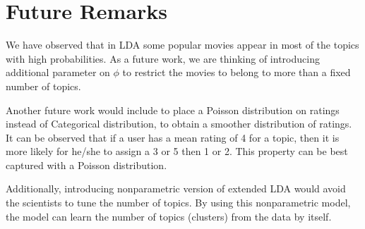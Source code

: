 \documentclass{article} %
\begin{document}
\section{Future Remarks}
We have observed that in LDA some popular movies appear in most of the topics with high probabilities. 
As a future work, we are thinking of introducing additional parameter on $\phi$ 
to restrict the movies to belong to more than a fixed number of topics. 

Another future work would include to place a Poisson distribution on ratings instead of 
Categorical distribution, to obtain a smoother distribution of ratings. It can 
be observed that if a user has a mean rating of 4 for a topic, then it is more 
likely for he/she to assign a 3 or 5 then 1 or 2. This property can be best 
captured with a Poisson distribution. 

Additionally, introducing nonparametric version of extended LDA would avoid the 
scientists to tune the number of topics. By using this nonparametric model, the 
model can learn the number of topics (clusters) from the data by itself. 



\end{document}
